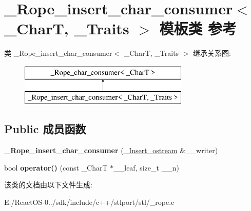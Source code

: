 \hypertarget{class___rope__insert__char__consumer}{}\section{\+\_\+\+Rope\+\_\+insert\+\_\+char\+\_\+consumer$<$ \+\_\+\+CharT, \+\_\+\+Traits $>$ 模板类 参考}
\label{class___rope__insert__char__consumer}
类 \+\_\+\+Rope\+\_\+insert\+\_\+char\+\_\+consumer$<$ \+\_\+\+CharT, \+\_\+\+Traits $>$ 继承关系图\+:\begin{figure}[H]
\begin{center}
\leavevmode
\includegraphics[height=2.000000cm]{class___rope__insert__char__consumer}
\end{center}
\end{figure}
\subsection*{Public 成员函数}
\begin{DoxyCompactItemize}
\item 
\mbox{\label{class___rope__insert__char__consumer_ac301be57390044a2a0bb1fc27d27d3cf}} 
{\bfseries \+\_\+\+Rope\+\_\+insert\+\_\+char\+\_\+consumer} (\hyperlink{classbasic__ostream}{\+\_\+\+Insert\+\_\+ostream} \&\+\_\+\+\_\+writer)
\item 
\mbox{\label{class___rope__insert__char__consumer_aaebd4f4700cbd2a921a732d2af7b529d}} 
bool {\bfseries operator()} (const \+\_\+\+CharT $\ast$\+\_\+\+\_\+leaf, size\+\_\+t \+\_\+\+\_\+n)
\end{DoxyCompactItemize}


该类的文档由以下文件生成\+:\begin{DoxyCompactItemize}
\item 
E\+:/\+React\+O\+S-\/0../sdk/include/c++/stlport/stl/\+\_\+rope.\+c\end{DoxyCompactItemize}
